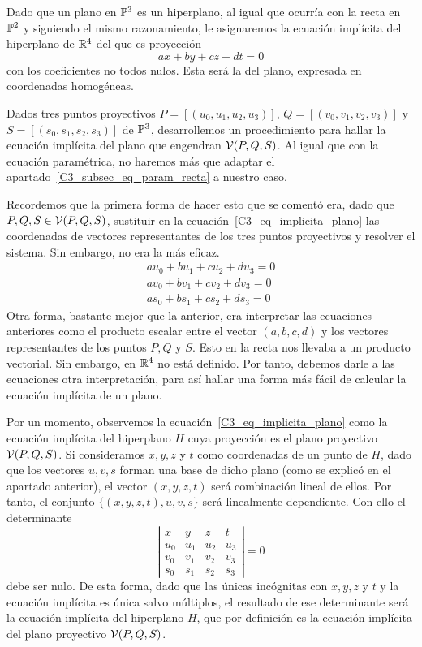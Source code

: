 Dado que un plano en $\mathbb{P}^3$ es un hiperplano, al igual que ocurría con la recta en $\mathbb{P}^2$ y siguiendo el mismo razonamiento, le asignaremos la ecuación implícita del hiperplano de $\mathbb{R}^4$ del que es proyección
\begin{equation}
\label{C3_eq_implicita_plano}
ax+by+cz+dt=0
\end{equation}
con los coeficientes no todos nulos. Esta será la  del plano, expresada en coordenadas homogéneas. 

Dados tres puntos proyectivos $P=[(u_0,u_1,u_2,u_3)]$, $Q=[(v_0,v_1,v_2,v_3)]$ y $S=[(s_0,s_1,s_2,s_3)]$ de $\mathbb{P}^3$, desarrollemos un procedimiento para hallar la ecuación implícita del plano que engendran $\mathcal{V}(P,Q,S)$. Al igual que con la ecuación paramétrica, no haremos más que adaptar el apartado~\ref{C3_subsec_eq_param_recta} a nuestro caso.

Recordemos que la primera forma de hacer esto que se comentó era, dado que $P,Q,S\in \mathcal{V}(P,Q,S)$, sustituir en la ecuación~\eqref{C3_eq_implicita_plano} las coordenadas de vectores representantes de los tres puntos proyectivos y resolver el sistema. Sin embargo, no era la más eficaz.
\begin{equation}
	\begin{split}
		au_0+bu_1+cu_2+du_3=0\\
		av_0+bv_1+cv_2+dv_3=0\\
		as_0+bs_1+cs_2+ds_3=0
	\end{split}
\end{equation}
Otra forma, bastante mejor que la anterior, era interpretar las ecuaciones anteriores como el producto escalar entre el vector $(a,b,c,d)$ y los vectores representantes de los puntos $P,Q$ y $S$. Esto en la recta nos llevaba a un producto vectorial. Sin embargo, en $\mathbb{R}^4$ no está definido. Por tanto, debemos darle a las ecuaciones otra interpretación, para así hallar una forma más fácil de calcular la ecuación implícita de un plano. 

Por un momento, observemos la ecuación~\eqref{C3_eq_implicita_plano} como la ecuación implícita del hiperplano $H$ cuya proyección es el plano proyectivo $\mathcal{V}(P,Q,S)$. Si consideramos $x,y,z$ y $t$ como coordenadas de un punto de $H$, dado que los vectores $u,v,s$ forman una base de dicho plano (como se explicó en el apartado anterior), el vector $(x,y,z,t)$ será combinación lineal de ellos. Por tanto, el conjunto $\{(x,y,z,t),u,v,s\}$ será linealmente dependiente. Con ello el determinante
\begin{equation}
	\left| \begin{array}{cccc}
	x & y & z& t\\
	u_0 & u_1 & u_2 & u_3\\
	v_0 & v_1 & v_2 & v_3\\
	s_0 & s_1 & s_2 & s_3
	\end{array}\right| =0
\end{equation}
debe ser nulo. De esta forma, dado que las únicas incógnitas con $x,y,z$ y $t$ y la ecuación implícita es única salvo múltiplos, el resultado de ese determinante será la ecuación implícita del hiperplano $H$, que por definición es la ecuación implícita del plano proyectivo $\mathcal{V}(P,Q,S)$.

